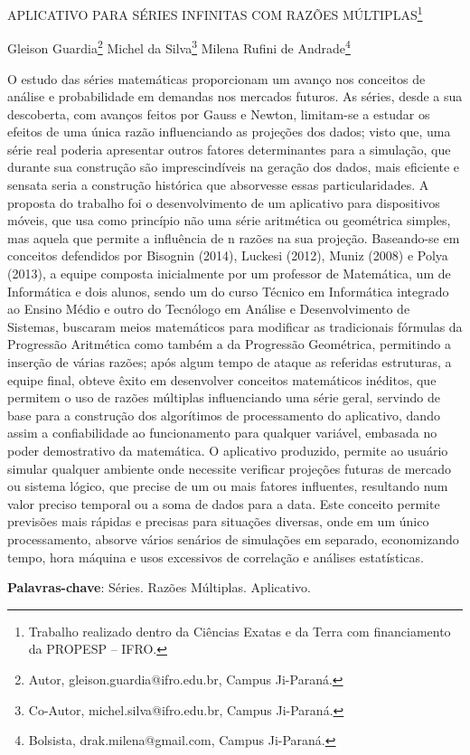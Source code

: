 \documentclass[article,12pt,onesidea,4paper,english,brazil]{abntex2}
\begin{document}
	
	
	\frenchspacing 
	
	\begin{center}
		\LARGE APLICATIVO PARA SÉRIES INFINITAS COM RAZÕES MÚLTIPLAS\footnote{Trabalho realizado dentro da Ciências Exatas e da Terra com financiamento da PROPESP – IFRO.}
		
		\normalsize
		Gleison Guardia\footnote{Autor, gleison.guardia@ifro.edu.br, Campus Ji-Paraná.} 
		Michel da Silva\footnote{Co-Autor, michel.silva@ifro.edu.br, Campus Ji-Paraná.} 
		Milena Rufini de Andrade\footnote{Bolsista, drak.milena@gmail.com, Campus Ji-Paraná.} 
	\end{center}
	
	\noindent O estudo das séries matemáticas proporcionam um avanço nos conceitos de análise
	e probabilidade em demandas nos mercados futuros. As séries, desde a sua
	descoberta, com avanços feitos por Gauss e Newton, limitam-se a estudar os efeitos
	de uma única razão influenciando as projeções dos dados; visto que, uma série real
	poderia apresentar outros fatores determinantes para a simulação, que durante sua
	construção são imprescindíveis na geração dos dados, mais eficiente e sensata
	seria a construção histórica que absorvesse essas particularidades. A proposta do
	trabalho foi o desenvolvimento de um aplicativo para dispositivos móveis, que usa
	como princípio não uma série aritmética ou geométrica simples, mas aquela que
	permite a influência de n razões na sua projeção. Baseando-se em conceitos
	defendidos por Bisognin (2014), Luckesi (2012), Muniz (2008) e Polya (2013), a
	equipe composta inicialmente por um professor de Matemática, um de Informática e
	dois alunos, sendo um do curso Técnico em Informática integrado ao Ensino Médio e
	outro do Tecnólogo em Análise e Desenvolvimento de Sistemas, buscaram meios
	matemáticos para modificar as tradicionais fórmulas da Progressão Aritmética como
	também a da Progressão Geométrica, permitindo a inserção de várias razões; após
	algum tempo de ataque as referidas estruturas, a equipe final, obteve êxito em
	desenvolver conceitos matemáticos inéditos, que permitem o uso de razões
	múltiplas influenciando uma série geral, servindo de base para a construção dos
	algorítimos de processamento do aplicativo, dando assim a confiabilidade ao
	funcionamento para qualquer variável, embasada no poder demostrativo da
	matemática. O aplicativo produzido, permite ao usuário simular qualquer ambiente
	onde necessite verificar projeções futuras de mercado ou sistema lógico, que precise
	de um ou mais fatores influentes, resultando num valor preciso temporal ou a soma
	de dados para a data. Este conceito permite previsões mais rápidas e precisas para
	situações diversas, onde em um único processamento, absorve vários senários de
	simulações em separado, economizando tempo, hora máquina e usos excessivos de
	correlação e análises estatísticas.
	
	\vspace{\onelineskip}
	
	\noindent
	\textbf{Palavras-chave}: Séries. Razões Múltiplas. Aplicativo.
	
\end{document}
